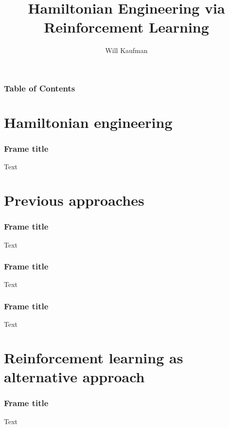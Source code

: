 \documentclass{beamer}
\title{Hamiltonian Engineering via Reinforcement Learning}
\author{Will Kaufman}
\institute{Ramanathan Group \\ Dartmouth College}
\begin{document}
\frame{\titlepage}

\begin{frame}
\frametitle{Table of Contents}
\tableofcontents
\end{frame}

\section{Hamiltonian engineering}

\begin{frame}
\frametitle{Frame title}
Text
\end{frame}

\section{Previous approaches}

\begin{frame}
\frametitle{Frame title}

Text

\end{frame}


\begin{frame}
\frametitle{Frame title}

Text

\end{frame}


\begin{frame}
\frametitle{Frame title}

Text

\end{frame}

\section{Reinforcement learning as alternative approach}

\begin{frame}
\frametitle{Frame title}
Text
\end{frame}

\end{document}
